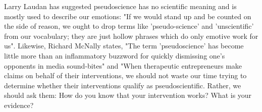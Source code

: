 \documentclass{article}
\begin{document}
Larry Laudan has suggested pseudoscience has no scientific meaning and is mostly 
used to describe our emotions: "If we would stand up and be counted on the side 
of reason, we ought to drop terms like 'pseudo-science' and 'unscientific' from our 
vocabulary; they are just hollow phrases which do only emotive work for 
us". Likewise, Richard McNally states, 
"The term 'pseudoscience' has become little more than an inflammatory buzzword 
for quickly dismissing one's opponents in media sound-bites" and "When 
therapeutic entrepreneurs make claims on behalf of their interventions, we should 
not waste our time trying to determine whether their interventions qualify as 
pseudoscientific. Rather, we should ask them: How do you know that your 
intervention works? What is your evidence?
 
\end{document}
